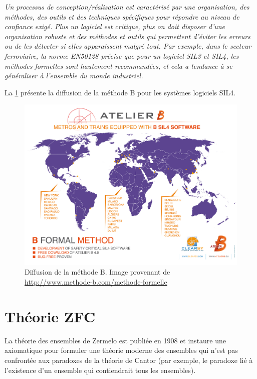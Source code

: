 \documentclass[10pt,a4paper]{article}
\begin{document}
\emph{Un processus de conception/réalisation est caractérisé par une organisation, des méthodes, des outils et des techniques spécifiques pour répondre au niveau de confiance exigé. Plus un logiciel est critique, plus on doit disposer d'une organisation robuste et des méthodes et outils qui permettent d'éviter les erreurs ou de les détecter si elles apparaissent malgré tout. Par exemple, dans le secteur ferroviaire, la norme EN50128 précise que pour un logiciel SIL3 et SIL4, les méthodes formelles sont hautement recommandées, et cela a tendance à se généraliser à l'ensemble du monde industriel.}\cite{dossierTechnique}

La \cref{UtilisationB} présente la diffusion de la méthode B pour les systèmes logiciels SIL4.
\begin{figure}[h]
\centering
\includegraphics[scale=0.23]{ressources/carte-monde-projets-b.jpg}
\caption{\label{UtilisationB}Diffusion de la méthode B. Image provenant de \url{http://www.methode-b.com/methode-formelle}}
\end{figure}


\appendix

\section{Théorie ZFC}
\label{ZFC}
La théorie des ensembles de Zermelo est publiée en 1908 et instaure une axiomatique pour formuler une théorie moderne des ensembles qui n'est pas confrontée aux paradoxes de la théorie de Cantor (par exemple, le paradoxe lié à l'existence d'un ensemble qui contiendrait tous les ensembles).
\end{document}

